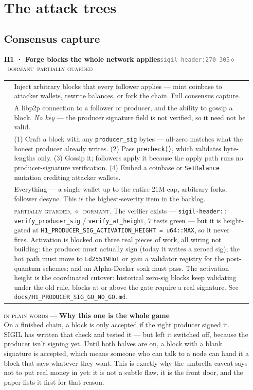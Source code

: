 \documentclass[10pt,a4paper]{article}
\makeatletter
\newcommand{\stD}{\textcolor{sigilviolet}{$\diamond$}~{\scriptsize\textcolor{sigilviolet}{\textsc{dormant}}}}
\newcommand{\svC}{{\scriptsize\textcolor{sigilred}{\textsc{catastrophic}}}}
\newcommand{\mgPartial}{{\scriptsize\textcolor{sigilviolet}{\textsc{partially guarded}}}}
\newcommand{\layman}[3]{%
\begin{tcolorbox}[enhanced,
  interior style={left color=#1!9,right color=white},
  colframe=#1!45!slate,boxrule=0.5pt,arc=3pt,
  borderline west={2.5pt}{0pt}{#1},
  left=9pt,right=9pt,top=7pt,bottom=7pt]
{\scriptsize\textcolor{#1}{\textsc{in plain words}}\; — \;\textbf{\small #2}}\\[3pt]
\small #3
\end{tcolorbox}}
\newcommand{\frow}[2]{{\footnotesize\textcolor{gray}{\textsc{#1}}}\;&\small #2\\}
\newenvironment{atkentry}[5]{%
\begin{tcolorbox}[enhanced,breakable,colback=white,colframe=slate,boxrule=0.6pt,arc=2pt,
  left=8pt,right=8pt,top=6pt,bottom=6pt,
  borderline west={3pt}{0pt}{sigilred!60!slate}]
{\small\textbf{#1 · #2}\hfill{\footnotesize\textcolor{gray}{\texttt{#3}}}\quad#4\quad#5}\\[4pt]
\begin{tabular}{@{}>{\raggedleft\arraybackslash}p{2.1cm}p{12.9cm}@{}}
}{%
\end{tabular}
\end{tcolorbox}\vspace{2pt}}
\makeatother
\begin{document}
\section{The attack trees}
\label{sec:trees}

\subsection{Consensus capture}

\begin{atkentry}{H1}{Forge blocks the whole network applies}{sigil-header:270-305}{\svC}{\stD~\mgPartial}
\frow{goal}{Inject arbitrary blocks that every follower applies — mint coinbase to
attacker wallets, rewrite balances, or fork the chain. Full consensus capture.}
\frow{preconditions}{A libp2p connection to a follower or producer, and the ability to
gossip a block. \emph{No key} — the producer signature field is not verified, so it need
not be valid.}
\frow{steps}{(1) Craft a block with any \texttt{producer\_sig} bytes — all-zero matches
what the honest producer already writes. (2) Pass \texttt{precheck()}, which validates
byte-lengths only. (3) Gossip it; followers apply it because the apply path runs no
producer-signature verification. (4) Embed a coinbase or \texttt{SetBalance} mutation
crediting attacker wallets.}
\frow{buys}{Everything — a single wallet up to the entire 21M cap, arbitrary forks,
follower desync. This is the highest-severity item in the backlog.}
\frow{defense}{\mgPartial{}, \stD{}. The verifier exists — \texttt{sigil-header::
verify\_producer\_sig} / \texttt{verify\_at\_height}, 7 tests green — but it is
height-gated at \texttt{H1\_PRODUCER\_SIG\_ACTIVATION\_HEIGHT = u64::MAX}, so it never
fires. Activation is blocked on three real pieces of work, all wiring not building: the
producer must actually sign (today it writes a zeroed sig); the hot path must move to
\texttt{Ed25519Hot} or gain a validator registry for the post-quantum schemes; and an
Alpha-Docker soak must pass. The activation height is the coordinated cutover: historical
zero-sig blocks keep validating under the old rule, blocks at or above the gate require a
real signature. See \texttt{docs/H1\_PRODUCER\_SIG\_GO\_NO\_GO.md}.}
\end{atkentry}

\layman{sigilred}{Why this one is the whole game}{On a finished chain, a block is only
accepted if the right producer signed it. SIGIL has written that check and tested it — but
left it switched off, because the producer isn't signing yet. Until both halves are on, a
block with a blank signature is accepted, which means someone who can talk to a node can
hand it a block that says whatever they want. This is exactly why the umbrella caveat says
not to put real money in yet: it is not a subtle flaw, it is the front door, and the paper
lists it first for that reason.}
\end{document}
